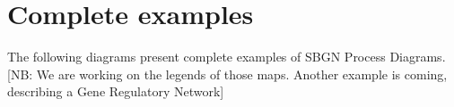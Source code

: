 \chapter{Complete examples}

The following diagrams present complete examples of SBGN Process Diagrams.
[NB: We are working on the legends of those maps. Another example is coming, describing a Gene Regulatory Network]

\begin{center}
\end{center}

\begin{center}
\end{center}

